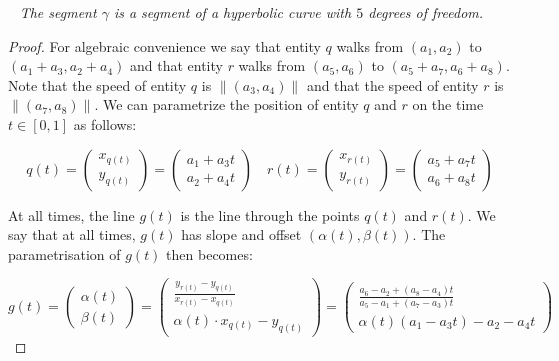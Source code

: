\documentclass[UKenglish]{lipics-v2019}
\newcommand{\thmheadfont}{\textcolor{darkgray}{$\blacktriangleright$}\nobreakspace\sffamily\bfseries}
\newenvironment{repeatenv}[2]%
  {\smallskip\noindent {\thmheadfont #1~\ref{#2}.}\ \slshape}
  {\normalfont}
\newenvironment{repeatlemma}      [1]{\begin{repeatenv}{Lemma}{#1}}      {\end{repeatenv}}
\begin{document}
\begin{repeatlemma}{lemma:hyperbola}
  The segment $\gamma$ is a segment of a hyperbolic curve with $5$ degrees of freedom.
\end{repeatlemma}

\begin{proof}%
For algebraic convenience we say that entity $q$ walks from $(a_1, a_2)$ to $(a_1 + a_3, a_2 + a_4)$ and that entity $r$ walks from $(a_5, a_6)$ to $(a_5 + a_7, a_6 + a_8)$. Note that the speed of entity $q$ is $\lVert (a_3, a_4) \rVert$ and that the speed of entity $r$ is $\lVert (a_7, a_8) \rVert$. We can parametrize the position of entity $q$ and $r$ on the time $t \in [0,1]$ as follows:

\begin{equation}
    \label{eq:line}
     q(t) = \left( \begin{array}{c}
         x_{q(t)}  \\
         y_{q(t)} 
    \end{array}  \right) = 
    \left( \begin{array}{c}
         a_1 + a_3 t \\
         a_2 + a_4 t
    \end{array}  \right)  \quad
      r(t) = \left( \begin{array}{c}
         x_{r(t)}  \\
         y_{r(t)} 
    \end{array}  \right) = 
    \left( \begin{array}{c}
         a_5 + a_7 t \\
         a_6 + a_8 t
    \end{array}  \right) 
\end{equation}


At all times, the line $g(t)$ is the line through the points $q(t)$ and $r(t)$. We say that at all times, $g(t)$ has slope and offset $(\alpha(t), \beta(t))$. The parametrisation of $g(t)$ then becomes:

\begin{equation}
\label{eq:curve}
   g(t) = \left( \begin{array}{c}
         \alpha(t)  \\
         \beta(t) 
    \end{array}  \right) = 
    \left( \begin{array}{c}
         \frac{y_{r(t)} - y_{q(t)}}{x_{r(t)} - x_{q(t)}}  \\
         \alpha(t)\cdot x_{q(t)} - y_{q(t)}
    \end{array}  \right) =
    \left( \begin{array}{c}
         \frac{ a_6 - a_2 + (a_8 - a_4) t}
      { a_5 - a_1  + (a_7 - a_3) t }  \\
         \alpha(t) (a_1 - a_3 t) - a_2 - a_4 t 
    \end{array}  \right)
  \end{equation}
  

\end{proof}
\end{document}
